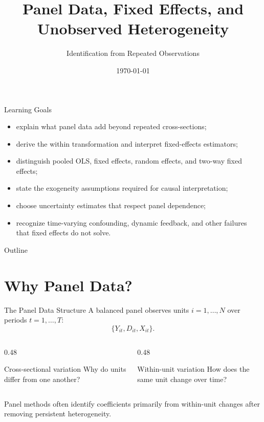 \documentclass[aspectratio=169,11pt]{beamer}
\title[Panel Data Econometrics]{Panel Data, Fixed Effects, and Unobserved Heterogeneity}
\subtitle{Identification from Repeated Observations}
\date{\today}
\begin{document}
\begin{frame}
\titlepage
\end{frame}

\begin{frame}{Learning Goals}
\begin{itemize}
\item explain what panel data add beyond repeated cross-sections;
\item derive the within transformation and interpret fixed-effects estimators;
\item distinguish pooled OLS, fixed effects, random effects, and two-way fixed effects;
\item state the exogeneity assumptions required for causal interpretation;
\item choose uncertainty estimates that respect panel dependence;
\item recognize time-varying confounding, dynamic feedback, and other failures that fixed effects do not solve.
\end{itemize}
\end{frame}

\begin{frame}{Outline}
\tableofcontents
\end{frame}

\section{Why Panel Data?}

\begin{frame}{The Panel Data Structure}
A balanced panel observes units \(i=1,\ldots,N\) over periods \(t=1,\ldots,T\):
\[
\{Y_{it},D_{it},X_{it}\}.
\]

\begin{columns}[T]
\begin{column}{0.48\textwidth}
\begin{block}{Cross-sectional variation}
Why do units differ from one another?
\end{block}
\end{column}
\begin{column}{0.48\textwidth}
\begin{block}{Within-unit variation}
How does the same unit change over time?
\end{block}
\end{column}
\end{columns}

\vspace{0.4cm}
Panel methods often identify coefficients primarily from within-unit changes after removing persistent heterogeneity.
\end{frame}
\end{document}

